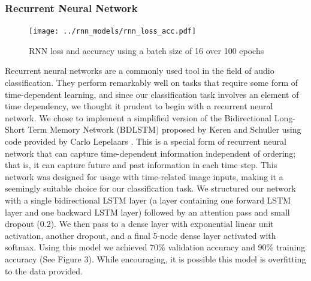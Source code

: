 \documentclass[11pt]{article}
\begin{document}
\subsubsection{Recurrent Neural Network}
\begin{figure}[!htb]
\begin{center}
   \texttt{[image: ../rnn\_models/rnn\_loss\_acc.pdf]}
   \caption{RNN loss and accuracy using a batch size of 16 over 100 epochs}
\end{center}
\end{figure}
Recurrent neural networks are a commonly used tool in the field of audio classification.
They perform remarkably well on tasks that require some form of time-dependent learning, and since our classification task involves an element of time dependency, we thought it prudent to begin with a recurrent neural network.
We chose to implement a simplified version of the Bidirectional Long-Short Term Memory Network (BDLSTM) proposed by Keren and Schuller \cite{keren_schuller} using code provided by Carlo Lepelaars \cite{lstm_kaggle}. This is a special form of recurrent neural network that can capture time-dependent information independent of ordering; that is, it can capture future and past information in each time step.
This network was designed for usage with time-related image inputs, making it a seemingly suitable choice for our classification task.
We structured our network with a single bidirectional LSTM layer (a layer containing one forward LSTM layer and one backward LSTM layer) followed by an attention pass and small dropout (0.2). We then pass to a dense layer with exponential linear unit activation, another dropout, and a final 5-node dense layer activated with softmax.
Using this model we achieved 70\% validation accuracy and 90\% training accuracy (See Figure 3).
While encouraging, it is possible this model is overfitting to the data provided.
\end{document}
